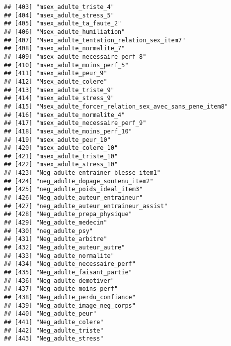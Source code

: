 \documentclass[
]{article}
\begin{document}
\begin{verbatim}
## [403] "msex_adulte_triste_4"                                
## [404] "msex_adulte_stress_5"                                
## [405] "msex_adulte_ta_faute_2"                              
## [406] "Msex_adulte_humiliation"                             
## [407] "Msex_adulte_tentation_relation_sex_item7"            
## [408] "msex_adulte_normalite_7"                             
## [409] "msex_adulte_necessaire_perf_8"                       
## [410] "msex_adulte_moins_perf_5"                            
## [411] "msex_adulte_peur_9"                                  
## [412] "Msex_adulte_colere"                                  
## [413] "msex_adulte_triste_9"                                
## [414] "msex_adulte_stress_9"                                
## [415] "Msex_adulte_forcer_relation_sex_avec_sans_pene_item8"
## [416] "msex_adulte_normalite_4"                             
## [417] "msex_adulte_necessaire_perf_9"                       
## [418] "msex_adulte_moins_perf_10"                           
## [419] "msex_adulte_peur_10"                                 
## [420] "msex_adulte_colere_10"                               
## [421] "msex_adulte_triste_10"                               
## [422] "msex_adulte_stress_10"                               
## [423] "Neg_adulte_entrainer_blesse_item1"                   
## [424] "neg_adulte_dopage_soutenu_item2"                     
## [425] "neg_adulte_poids_ideal_item3"                        
## [426] "Neg_adulte_auteur_entraineur"                        
## [427] "neg_adulte_auteur_entraineur_assist"                 
## [428] "Neg_adulte_prepa_physique"                           
## [429] "Neg_adulte_medecin"                                  
## [430] "neg_adulte_psy"                                      
## [431] "Neg_adulte_arbitre"                                  
## [432] "Neg_adulte_auteur_autre"                             
## [433] "Neg_adulte_normalite"                                
## [434] "Neg_adulte_necessaire_perf"                          
## [435] "Neg_adulte_faisant_partie"                           
## [436] "Neg_adulte_demotiver"                                
## [437] "Neg_adulte_moins_perf"                               
## [438] "Neg_adulte_perdu_confiance"                          
## [439] "Neg_adulte_image_neg_corps"                          
## [440] "Neg_adulte_peur"                                     
## [441] "Neg_adulte_colere"                                   
## [442] "Neg_adulte_triste"                                   
## [443] "Neg_adulte_stress"                                   

\end{verbatim}
\end{document}
